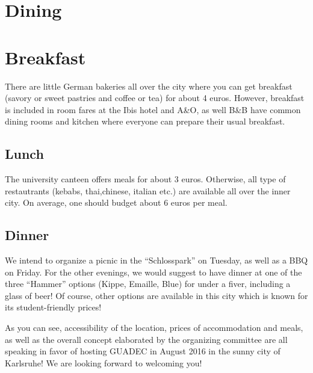 \section{Dining}

\section{Breakfast}
There are little German bakeries all over the city where you can get breakfast (savory or sweet pastries and coffee or tea) for about 4 euros. However, breakfast is included in room fares at the Ibis hotel and A&O, as well B&B have common dining rooms and kitchen where everyone can prepare their usual breakfast.
 
\subsection{Lunch}
The university canteen offers meals for about 3 euros. Otherwise, all type of restautrants (kebabs, thai,chinese, italian etc.) are available all over the inner city. On average, one should budget about 6 euros per meal.


\subsection{Dinner}
We intend to organize a picnic in the “Schlosspark” on Tuesday, as well as a BBQ on Friday. For the other evenings, we would suggest to have dinner at one of the three “Hammer” options (Kippe, Emaille, Blue) for under a fiver, including a glass of beer! Of course, other options are available in this city which is known for its student-friendly prices!


As you can see, accessibility of the location, prices of accommodation and meals, as well as the overall concept elaborated by the organizing committee are all speaking in favor of hosting GUADEC in August 2016 in the sunny city of Karlsruhe! We are looking forward to welcoming you!
